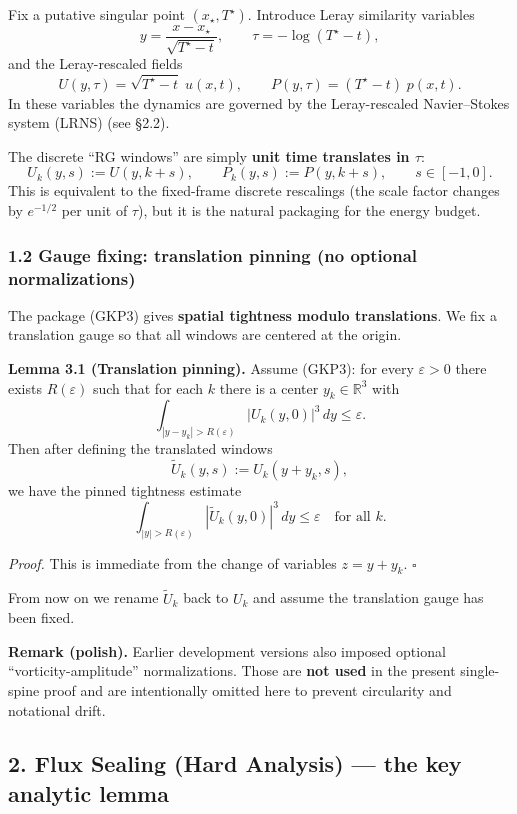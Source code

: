 \documentclass[
  11pt,
]{article}
\begin{document}
Fix a putative singular point \((x_\star,T^\star)\). Introduce Leray similarity variables \[
y=\frac{x-x_\star}{\sqrt{T^\star-t}},\qquad \tau=-\log(T^\star-t),
\] and the Leray-rescaled fields \[
U(y,\tau)=\sqrt{T^\star-t}\;u(x,t),\qquad P(y,\tau)=(T^\star-t)\;p(x,t).
\] In these variables the dynamics are governed by the Leray-rescaled Navier--Stokes system (LRNS) (see §2.2).

The discrete ``RG windows'' are simply \textbf{unit time translates in \(\tau\)}: \[
U_k(y,s):=U(y,k+s),\qquad P_k(y,s):=P(y,k+s),\qquad s\in[-1,0].
\] This is equivalent to the fixed-frame discrete rescalings (the scale factor changes by \(e^{-1/2}\) per unit of \(\tau\)), but it is the natural packaging for the energy budget.

\hypertarget{gauge-fixing-translation-pinning-no-optional-normalizations}{%
\subsubsection{1.2 Gauge fixing: translation pinning (no optional normalizations)}\label{gauge-fixing-translation-pinning-no-optional-normalizations}}

The package (GKP3) gives \textbf{spatial tightness modulo translations}. We fix a translation gauge so that all windows are centered at the origin.

\textbf{Lemma 3.1 (Translation pinning).} Assume (GKP3): for every \(\varepsilon>0\) there exists \(R(\varepsilon)\) such that for each \(k\) there is a center \(y_k\in\mathbb R^3\) with \[
\int_{|y-y_k|>R(\varepsilon)} |U_k(y,0)|^3\,dy \le \varepsilon.
\] Then after defining the translated windows \[
\widetilde U_k(y,s):=U_k(y+y_k,s),
\] we have the pinned tightness estimate \[
\int_{|y|>R(\varepsilon)} |\widetilde U_k(y,0)|^3\,dy \le \varepsilon
\quad\text{for all }k.
\]

\emph{Proof.} This is immediate from the change of variables \(z=y+y_k\). \(\square\)

From now on we rename \(\widetilde U_k\) back to \(U_k\) and assume the translation gauge has been fixed.

\textbf{Remark (polish).} Earlier development versions also imposed optional ``vorticity-amplitude'' normalizations. Those are \textbf{not used} in the present single-spine proof and are intentionally omitted here to prevent circularity and notational drift.

\hypertarget{flux-sealing-hard-analysis-the-key-analytic-lemma}{%
\subsection{2. Flux Sealing (Hard Analysis) --- the key analytic lemma}\label{flux-sealing-hard-analysis-the-key-analytic-lemma}}
\end{document}
